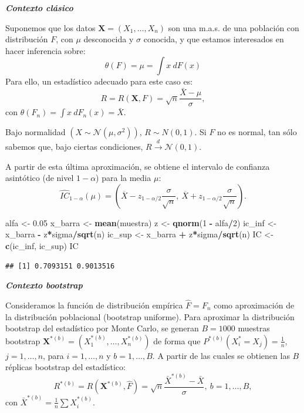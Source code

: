 \documentclass[]{book}
\newenvironment{Shaded}{\begin{snugshade}}{\end{snugshade}}
\newcommand{\KeywordTok}[1]{\textcolor[rgb]{0.13,0.29,0.53}{\textbf{#1}}}
\newcommand{\DecValTok}[1]{\textcolor[rgb]{0.00,0.00,0.81}{#1}}
\newcommand{\FloatTok}[1]{\textcolor[rgb]{0.00,0.00,0.81}{#1}}
\newcommand{\StringTok}[1]{\textcolor[rgb]{0.31,0.60,0.02}{#1}}
\newcommand{\OperatorTok}[1]{\textcolor[rgb]{0.81,0.36,0.00}{\textbf{#1}}}
\newcommand{\NormalTok}[1]{#1}
\theoremstyle{definition}
\theoremstyle{definition}
\theoremstyle{definition}
\theoremstyle{remark}
\begin{document}
\textbf{\emph{Contexto clásico}}

Suponemos que los datos \(\mathbf{X}=\left( X_1,\ldots ,X_n \right)\)
son una m.a.s. de una población con distribución \(F\), con \(\mu\)
desconocida y \(\sigma\) conocida, y que estamos interesados en hacer
inferencia sobre:
\[\theta \left( F \right) =\mu =\int x~dF\left( x \right)\] Para ello,
un estadístico adecuado para este caso es:
\[R=R\left( \mathbf{X},F \right) =\sqrt{n}\frac{\bar{X}-\mu }{\sigma},\]
con
\(\theta \left( F_n \right) =\int x~dF_n\left( x \right) = \bar{X}\).

Bajo normalidad
\(\left( X\sim \mathcal{N}\left( \mu ,\sigma^2 \right) \right)\),
\(R\sim N\left( 0,1 \right)\). Si \(F\) no es normal, tan sólo sabemos
que, bajo ciertas condiciones,
\(R\overset{d}{\rightarrow }\mathcal{N}\left( 0, 1 \right)\).

A partir de esta última aproximación, se obtiene el intervalo de
confianza asintótico (de nivel \(1-\alpha\)) para la media \(\mu\):
\[\hat{IC}_{1-\alpha}\left(  \mu\right)  = 
\left(  \overline{X}-z_{1-\alpha/2}\dfrac{\sigma}{\sqrt{n}},\ \overline{X} 
+ z_{1-\alpha/2}\dfrac{\sigma}{\sqrt{n}} \right).\]

\begin{Shaded}
\begin{Highlighting}[]
\NormalTok{alfa <-}\StringTok{ }\FloatTok{0.05}
\NormalTok{x_barra <-}\StringTok{ }\KeywordTok{mean}\NormalTok{(muestra)}
\NormalTok{z <-}\StringTok{ }\KeywordTok{qnorm}\NormalTok{(}\DecValTok{1} \OperatorTok{-}\StringTok{ }\NormalTok{alfa}\OperatorTok{/}\DecValTok{2}\NormalTok{)}
\NormalTok{ic_inf <-}\StringTok{ }\NormalTok{x_barra }\OperatorTok{-}\StringTok{ }\NormalTok{z}\OperatorTok{*}\NormalTok{sigma}\OperatorTok{/}\KeywordTok{sqrt}\NormalTok{(n)}
\NormalTok{ic_sup <-}\StringTok{ }\NormalTok{x_barra }\OperatorTok{+}\StringTok{ }\NormalTok{z}\OperatorTok{*}\NormalTok{sigma}\OperatorTok{/}\KeywordTok{sqrt}\NormalTok{(n)}
\NormalTok{IC <-}\StringTok{ }\KeywordTok{c}\NormalTok{(ic_inf, ic_sup)}
\NormalTok{IC}
\end{Highlighting}
\end{Shaded}

\begin{verbatim}
## [1] 0.7093151 0.9013516
\end{verbatim}

\textbf{\emph{Contexto bootstrap}}

Consideramos la función de distribución empírica \(\hat{F}=F_n\) como
aproximación de la distribución poblacional (bootstrap uniforme). Para
aproximar la distribución bootstrap del estadístico por Monte Carlo, se
generan \(B=1000\) muestras bootstrap
\(\mathbf{X}^{\ast (b)}=\left( X_1^{\ast (b)},\ldots ,X_n^{\ast (b)} \right)\)
de forma que
\(P^{\ast (b)}\left( X_i^{\ast}=X_j \right) = \frac{1}{n}\),
\(j=1,\ldots ,n\), para \(i=1,\ldots, n\) y \(b=1,\ldots, B\). A partir
de las cuales se obtienen las \(B\) réplicas bootstrap del estadístico:
\[R^{\ast (b)}=R\left( \mathbf{X}^{\ast (b)},\hat{F} \right) =\sqrt{n}\frac{
\bar{X}^{\ast  (b)}-\bar{X}}{\sigma }, \ b=1,\ldots, B, \] con
\(\bar{X}^{\ast (b)} = \frac{1}{n}\sum X_i^{\ast (b)}\).
\end{document}
